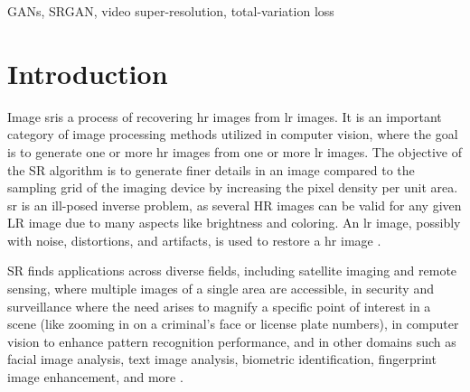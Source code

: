 \documentclass[conference]{IEEEtran}
\begin{document}
\begin{IEEEkeywords}
GANs, SRGAN, video super-resolution, total-variation loss
\end{IEEEkeywords}

\section{Introduction}
Image \acrfull{sr}is a process of recovering \acrfull{hr} images from \acrfull{lr} images. It is an important category of image processing methods utilized in computer vision, where the goal is to generate one or more \acrshort{hr} images from one or more \acrshort{lr} images. The objective of the SR algorithm is to generate finer details in an image compared to the sampling grid of the imaging device by increasing the pixel density per unit area. \acrshort{sr} is an ill-posed inverse problem, as several HR images can be valid for any given LR image due to many aspects like brightness and coloring. An \acrshort{lr} image, possibly with noise, distortions, and artifacts, is used to restore a \acrshort{hr} image \cite{Hitchhiker_guide_super_res_2023, sr_ill_posed_2021}.

SR finds applications across diverse fields, including satellite imaging and remote sensing, where multiple images of a single area are accessible, in security and surveillance where the need arises to magnify a specific point of interest in a scene (like zooming in on a criminal's face or license plate numbers), in computer vision to enhance pattern recognition performance, and in other domains such as facial image analysis, text image analysis, biometric identification, fingerprint image enhancement, and more \cite{sr_technical_overview_2003}.
\end{document}
